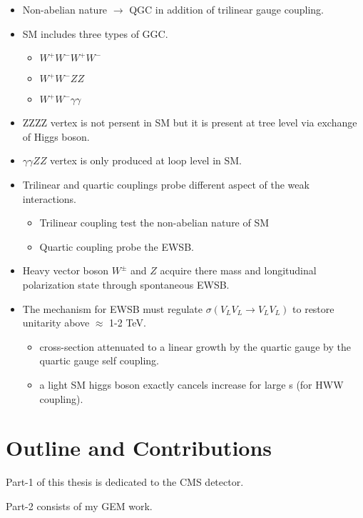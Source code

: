 \begin{itemize}
\item Non-abelian nature $\rightarrow$ QGC in addition of trilinear gauge coupling.
\item SM includes three types of GGC.
	\begin{itemize}
    \item $W^+W^-W^+W^-$
    \item $W^+W^-ZZ$
    \item $W^+W^-\gamma \gamma$
    \end{itemize}
\item ZZZZ vertex is not persent in SM but it is present at tree level via exchange of Higgs boson.
\item $\gamma \gamma ZZ$ vertex is only produced at loop level in SM.
\item Trilinear and quartic couplings probe different aspect of the weak interactions.
	\begin{itemize}
    \item Trilinear coupling test the non-abelian nature of SM
    \item Quartic coupling probe the EWSB.
    \end{itemize}
\end{itemize}

\begin{itemize}
\item Heavy vector boson $W^{\pm}$ and $Z$ acquire there mass and longitudinal polarization state through spontaneous EWSB.
\item The mechanism for EWSB must regulate $\sigma(V_LV_L \rightarrow V_LV_L )$ to restore unitarity above $\approx$ 1-2 TeV.
	\begin{itemize}
    \item cross-section attenuated to a linear growth by the quartic gauge by the quartic gauge self coupling.
    \item a light SM higgs boson exactly cancels increase for large s (for HWW coupling).
    \end{itemize}
\end{itemize}

\section{Outline and Contributions}


Part-1 of this thesis is dedicated to the CMS detector.

Part-2 consists of my GEM work.

